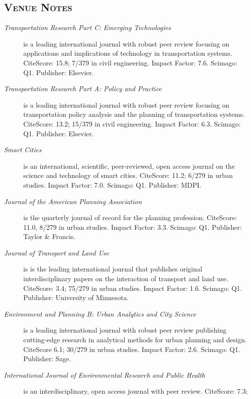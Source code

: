 \documentclass[margin,line]{res}
\newif\ifdetail
\newcommand{\secfont}{\scshape }
\begin{document}
\begin{resume}
\ifdetail
\section{\secfont{Venue Notes}}
\begin{description}
  \item[\textit{Transportation Research Part C: Emerging Technologies}] is a
  leading international journal with robust peer review focusing on applications
  and implications of technology in transportation systems.
  CiteScore: 15.8; 7/379 in civil engineering.  Impact Factor: 7.6. Scimago: Q1. Publisher: Elsevier.
  \item[\textit{Transportation Research Part A: Policy and Practice}] is
   a leading international journal with robust peer review focusing on
   transportation policy  analysis and the planning of transportation systems.
   CiteScore: 13.2; 15/379 in civil engineering. Impact Factor: 6.3. Scimago: Q1. Publisher: Elsevier.
  \item[\textit{Smart Cities}] is an international, scientific, peer-reviewed,
  open access journal on the science and technology of smart cities. CiteScore:
  11.2; 6/279 in urban studies. Impact Factor: 7.0. Scimago: Q1. Publisher: MDPI.
  \item[\textit{Journal of the American Planning Association}] is the quarterly
  journal of record for the planning profession. CiteScore: 11.0, 8/279 in urban studies. 
  Impact Factor: 3.3. Scimago: Q1.  Publisher: Taylor \& Francis.
  \item[\textit{Journal of Transport and Land Use}] is is the leading
  international journal that publishes original interdisciplinary papers on the
  interaction of transport and land use. CiteScore: 3.4; 75/279 in urban
  studies. Impact Factor: 1.6. Scimago: Q1. Publisher: University of Minnesota.
  \item[\textit{Environment and Planning B: Urban Analytics and City Science}]
  is a leading international journal with robust peer review publishing
  cutting-edge research in analytical methods for urban planning and
  design. CiteScore 6.1; 30/279 in urban studies. Impact Factor: 2.6. Scimago: Q1. Publisher: Sage.
  \item[\textit{International Journal of Environmental Research and Public Health}]
  is an interdisciplinary, open access journal with peer review. CiteScore: 7.3;

\end{description}
\end{resume}
\end{document}

